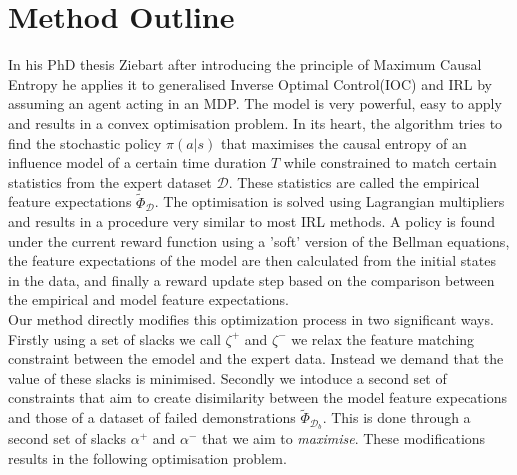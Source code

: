 \documentclass[conference]{IEEEtran}
\begin{document}
\section{Method Outline}
	In his PhD thesis Ziebart after introducing the principle of Maximum Causal Entropy he applies it to generalised Inverse Optimal Control(IOC) and IRL by assuming an agent acting in an MDP. The model is very powerful, easy to apply and results in a convex optimisation problem. In its heart, the algorithm tries to find the stochastic policy $\pi(a|s)$ that maximises the causal entropy of an influence model of a certain time duration $T$ while constrained to match certain statistics from the expert dataset $\mathcal{D}$. These statistics are called the empirical feature expectations $\widetilde{\Phi}_{\mathcal{D}}$. The optimisation is solved using Lagrangian multipliers and results in a procedure very similar to most IRL methods. A policy
	is found under the current reward function using a 'soft' version of the Bellman equations, the feature expectations of the model are then calculated from the initial  states in the data, and finally a reward update step based on the comparison between the empirical and model feature expectations.\\
	Our method directly modifies this optimization process in two significant ways. Firstly using a set of slacks we call $\zeta^+$ and $\zeta^-$ we relax the feature matching constraint between the emodel and the expert data. Instead we demand that the value of these slacks is minimised. Secondly we intoduce a second set of constraints that aim to create disimilarity between the model feature expecations and those of a dataset of failed demonstrations $\widetilde{\Phi}_{\mathcal{D}_b}$. This is done through a second set of slacks $\alpha^+$ and $\alpha^-$ that we aim to \emph{maximise}. These modifications results in the following optimisation problem.
	
\end{document}
